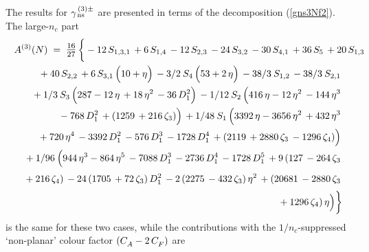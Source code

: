 \documentclass[12pt]{article}
\newcommand{\bea}{\begin{eqnarray}}
\newcommand{\eea}{\end{eqnarray}}
\newcommand{\nn}{\nonumber}
\begin{document}
The results for $\gamma^{\,(3)\pm}_{\,\rm ns}$ are presented in terms of 
the decomposition (\ref{gns3Nf2}). The large-$n_c$ part 
%
\bea
\label{eqn:A}
\lefteqn{A^{(3)}(N) \;=\;
\frct{16}{27}\* \,\bigg\{
       - 12\, \* \Sss(1,3,1)\,
       + 6\, \* \Ss(1,4)\,
       - 12\, \* \Ss(2,3)\,
       - 24\, \* \Ss(3,2)\,
       - 30\, \* \Ss(4,1)\,
       + 36\, \* \S(5)\,
       + 20\, \* \Ss(1,3)\,
}
   \nn \\[0.0mm] & & \mbox{}
       + 40\, \* \Ss(2,2)\,
       + 6\, \* \Ss(3,1)\, \* \Big(10 + \eta\Big)\,
       - 3/2\: \* \S(4)\, \* \Big(53 + 2\, \* \eta\Big)\,
       - 38/3\: \* \Ss(1,2)\,
       - 38/3\: \* \Ss(2,1)\,
   \nn \\[0.0mm] & & \mbox{}
       + 1/3\: \* \S(3)\, \* \Big(287 - 12\, \* \eta\,
              + 18\, \* \eta^{2}\,
              - 36\, \* D_{1}^{2}\Big)\,
       - 1/12\: \* \S(2)\, \* \Big(416\, \* \eta - 12\, \* \eta^{2}\,
              - 144\, \* \eta^{3}\,
   \nn \\[0.0mm] & & \mbox{}
              - 768\, \* D_{1}^{2}\,
              + (1259\,
              + 216\, \* \zeta_3)\Big)\,
       + 1/48\: \* \S(1)\, \* \Big(3392\, \* \eta - 3656\, \* \eta^{2}\,
              + 432\, \* \eta^{3}\,
   \nn \\[0.0mm] & & \mbox{}
              + 720\, \* \eta^{4}\,
              - 3392\, \* D_{1}^{2}\,
              - 576\, \* D_{1}^{3}\,
              - 1728\, \* D_{1}^{4}\,
              + (2119\,
              + 2880\, \* \zeta_3\,
              - 1296\, \* \zeta_4)\Big)\,
   \nn \\[0.0mm] & & \mbox{}
       + 1/96\: \* \Big(944\, \* \eta^{3} - 864\, \* \eta^{5}\,
              - 7088\, \* D_{1}^{3}\,
              - 2736\, \* D_{1}^{4}\,
              - 1728\, \* D_{1}^{5}\,
              + 9\, \* (127\,
              - 264\, \* \zeta_3\,
   \nn \\[0.5mm] & & \mbox{}
              + 216\, \* \zeta_4)\,
              - 24\, \* (1705\,
              + 72\, \* \zeta_3)\, \* D_{1}^{2}\,
              - 2\, \* (2275\,
              - 432\, \* \zeta_3)\, \* \eta^{2}\,
              + (20681\,
              - 2880\, \* \zeta_3\,
   \nn \\[0.5mm] & & \mbox{}
              + 1296\, \* \zeta_4)\, \* \eta\Big)
\bigg\}
\eea
%
is the same for these two cases, while the contributions with the
$1/n_c$-suppressed `non-planar' colour factor $({C^{}_A} - 2\,{C^{}_F})$ are 
\end{document}
